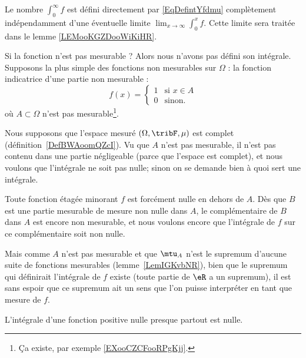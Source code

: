 \begin{normaltext}
    Le nombre \( \int_0^{\infty}f\) est défini directement par \eqref{EqDefintYfdmu} complètement indépendamment d'une éventuelle limite \( \lim_{x\to \infty} \int_{0}^xf\). 
    Cette limite sera traitée dans le lemme \ref{LEMooKGZDooWiKiHR}.
\end{normaltext}

\begin{normaltext}      \label{NORMooXTGBooKDnAhZ}
	Si la fonction n'est pas mesurable ? Alors nous n'avons pas défini son intégrale. Supposons la plus simple des fonctions non mesurables sur \( \Omega\) : la fonction indicatrice d'une partie non mesurable :
	\begin{equation}
		f(x)=\begin{cases}
			1 & \text{si } x\in A \\
			0 & \text{sinon. }
		\end{cases}
	\end{equation}
	où \( A\subset \Omega\) n'est pas mesurable\footnote{Ça existe, par exemple \ref{EXooCZCFooRPgKjj}.}.

	Nous supposons que l'espace mesuré \( (\Omega,\tribF,\mu)\) est complet (définition~\ref{DefBWAoomQZcI}). Vu que \( A\) n'est pas mesurable, il n'est pas contenu dans une partie négligeable (parce que l'espace est complet), et nous voulons que l'intégrale ne soit pas nulle; sinon on se demande bien à quoi sert une intégrale.

	Toute fonction étagée minorant \( f\) est forcément nulle en dehors de \( A\). Dès que \( B\) est une partie mesurable de mesure non nulle dans \( A\), le complémentaire de \( B\) dans \( A\) est encore non mesurable, et nous voulons encore que l'intégrale de \( f\) sur ce complémentaire soit non nulle.

	Mais comme \( A\) n'est pas mesurable et que \( \mtu_A\) n'est le supremum d'aucune suite de fonctions mesurables (lemme~\ref{LemIGKvbNR}), bien que le supremum qui définirait l'intégrale de \( f\) existe (toute partie de \( \eR\) a un supremum), il est sans espoir que ce supremum ait un sens que l'on puisse interpréter en tant que mesure de \( f\).
\end{normaltext}

\begin{lemma}  \label{LEMooHAUGooWITETb}
	L'intégrale d'une fonction positive nulle presque partout est nulle.
\end{lemma}

